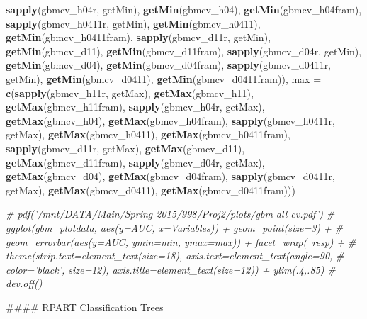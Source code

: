\documentclass[11pt,]{article}
\newenvironment{Shaded}{\begin{snugshade}}{\end{snugshade}}
\newcommand{\KeywordTok}[1]{\textcolor[rgb]{0.13,0.29,0.53}{\textbf{{#1}}}}
\newcommand{\DataTypeTok}[1]{\textcolor[rgb]{0.13,0.29,0.53}{{#1}}}
\newcommand{\CommentTok}[1]{\textcolor[rgb]{0.56,0.35,0.01}{\textit{{#1}}}}
\newcommand{\NormalTok}[1]{{#1}}
\begin{document}
\begin{Shaded}
\begin{Highlighting}[]
{        \KeywordTok{sapply}\NormalTok{(gbmcv_h04r, getMin), }\KeywordTok{getMin}\NormalTok{(gbmcv_h04), }\KeywordTok{getMin}\NormalTok{(gbmcv_h04fram), }
        \KeywordTok{sapply}\NormalTok{(gbmcv_h0411r, getMin), }\KeywordTok{getMin}\NormalTok{(gbmcv_h0411), }\KeywordTok{getMin}\NormalTok{(gbmcv_h0411fram), }
        \KeywordTok{sapply}\NormalTok{(gbmcv_d11r, getMin), }\KeywordTok{getMin}\NormalTok{(gbmcv_d11), }\KeywordTok{getMin}\NormalTok{(gbmcv_d11fram), }
        \KeywordTok{sapply}\NormalTok{(gbmcv_d04r, getMin), }\KeywordTok{getMin}\NormalTok{(gbmcv_d04), }\KeywordTok{getMin}\NormalTok{(gbmcv_d04fram), }
        \KeywordTok{sapply}\NormalTok{(gbmcv_d0411r, getMin), }\KeywordTok{getMin}\NormalTok{(gbmcv_d0411), }\KeywordTok{getMin}\NormalTok{(gbmcv_d0411fram)), }
    \DataTypeTok{max =} \KeywordTok{c}\NormalTok{(}\KeywordTok{sapply}\NormalTok{(gbmcv_h11r, getMax), }\KeywordTok{getMax}\NormalTok{(gbmcv_h11), }\KeywordTok{getMax}\NormalTok{(gbmcv_h11fram), }
        \KeywordTok{sapply}\NormalTok{(gbmcv_h04r, getMax), }\KeywordTok{getMax}\NormalTok{(gbmcv_h04), }\KeywordTok{getMax}\NormalTok{(gbmcv_h04fram), }
        \KeywordTok{sapply}\NormalTok{(gbmcv_h0411r, getMax), }\KeywordTok{getMax}\NormalTok{(gbmcv_h0411), }\KeywordTok{getMax}\NormalTok{(gbmcv_h0411fram), }
        \KeywordTok{sapply}\NormalTok{(gbmcv_d11r, getMax), }\KeywordTok{getMax}\NormalTok{(gbmcv_d11), }\KeywordTok{getMax}\NormalTok{(gbmcv_d11fram), }
        \KeywordTok{sapply}\NormalTok{(gbmcv_d04r, getMax), }\KeywordTok{getMax}\NormalTok{(gbmcv_d04), }\KeywordTok{getMax}\NormalTok{(gbmcv_d04fram), }
        \KeywordTok{sapply}\NormalTok{(gbmcv_d0411r, getMax), }\KeywordTok{getMax}\NormalTok{(gbmcv_d0411), }\KeywordTok{getMax}\NormalTok{(gbmcv_d0411fram)))}

\CommentTok{# pdf('/mnt/DATA/Main/Spring 2015/998/Proj2/plots/gbm all cv.pdf')}
\CommentTok{# ggplot(gbm_plotdata, aes(y=AUC, x=Variables)) + geom_point(size=3) +}
\CommentTok{# geom_errorbar(aes(y=AUC, ymin=min, ymax=max)) + facet_wrap(~resp) +}
\CommentTok{# theme(strip.text=element_text(size=18), axis.text=element_text(angle=90,}
\CommentTok{# color='black', size=12), axis.title=element_text(size=12)) + ylim(.4,.85)}
\CommentTok{# dev.off()}


\NormalTok{#### RPART Classification Trees}

}
\end{Highlighting}
\end{Shaded}
\end{document}
